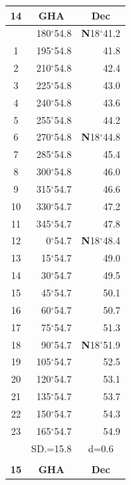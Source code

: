 \documentclass[10pt, a4paper]{report}
\begin{document}
\begin{scriptsize}
\begin{tabular*}{0.2\textwidth}[t]{@{\extracolsep{\fill}}|c|rr|}
\hline
\multicolumn{1}{|c|}{\rule{0pt}{2.6ex}\textbf{14}} & \multicolumn{1}{c}{\textbf{GHA}} & \multicolumn{1}{c|}{\textbf{Dec}}\\
\hline\rule{0pt}{2.6ex}\noindent
0 & 180$^\circ$54.8 & \textbf{N}18$^\circ$41.2\\
1 & 195$^\circ$54.8 & 41.8\\
2 & 210$^\circ$54.8 & 42.4\\
3 & 225$^\circ$54.8 & \raisebox{0.24ex}{\boldmath$\cdot$~\boldmath$\cdot$~~}43.0\\
4 & 240$^\circ$54.8 & 43.6\\
5 & 255$^\circ$54.8 & 44.2\\[2Pt]
6 & 270$^\circ$54.8 & \textbf{N}18$^\circ$44.8\\
7 & 285$^\circ$54.8 & 45.4\\
8 & 300$^\circ$54.8 & 46.0\\
9 & 315$^\circ$54.7 & \raisebox{0.24ex}{\boldmath$\cdot$~\boldmath$\cdot$~~}46.6\\
10 & 330$^\circ$54.7 & 47.2\\
11 & 345$^\circ$54.7 & 47.8\\[2Pt]
12 & 0$^\circ$54.7 & \textbf{N}18$^\circ$48.4\\
13 & 15$^\circ$54.7 & 49.0\\
14 & 30$^\circ$54.7 & 49.5\\
15 & 45$^\circ$54.7 & \raisebox{0.24ex}{\boldmath$\cdot$~\boldmath$\cdot$~~}50.1\\
16 & 60$^\circ$54.7 & 50.7\\
17 & 75$^\circ$54.7 & 51.3\\[2Pt]
18 & 90$^\circ$54.7 & \textbf{N}18$^\circ$51.9\\
19 & 105$^\circ$54.7 & 52.5\\
20 & 120$^\circ$54.7 & 53.1\\
21 & 135$^\circ$54.7 & \raisebox{0.24ex}{\boldmath$\cdot$~\boldmath$\cdot$~~}53.7\\
22 & 150$^\circ$54.7 & 54.3\\
23 & 165$^\circ$54.7 & 54.9\\
\hline
\rule{0pt}{2.4ex} & \multicolumn{1}{c}{SD.=15.8} & \multicolumn{1}{c|}{d=0.6}\\
\hline
\multicolumn{1}{c}{}\\[-0.5ex]\hline
\multicolumn{1}{|c|}{\rule{0pt}{2.6ex}\textbf{15}} & \multicolumn{1}{c}{\textbf{GHA}} & \multicolumn{1}{c|}{\textbf{Dec}}\\

\end{tabular*}
\end{scriptsize}
\end{document}
